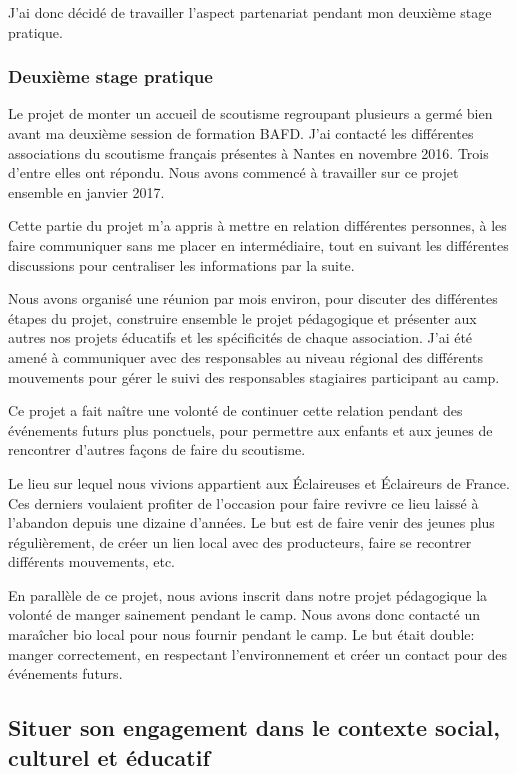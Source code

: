 \documentclass[titlepage,11pt,a4paper]{article}
\begin{document}
J'ai donc décidé de travailler l'aspect partenariat pendant mon deuxième stage pratique.

\subsubsection{Deuxième stage pratique}

Le projet de monter un accueil de scoutisme regroupant plusieurs a germé bien avant ma
deuxième session de formation BAFD\@. J'ai contacté les différentes associations du
scoutisme français présentes à Nantes en novembre 2016. Trois d'entre elles ont répondu.
Nous avons commencé à travailler sur ce projet ensemble en janvier 2017.

Cette partie du projet m'a appris à mettre en relation différentes personnes, à les faire
communiquer sans me placer en intermédiaire, tout en suivant les différentes discussions
pour centraliser les informations par la suite.

Nous avons organisé une réunion par mois environ, pour discuter des différentes étapes du
projet, construire ensemble le projet pédagogique et présenter aux autres nos projets
éducatifs et les spécificités de chaque association. J'ai été amené à communiquer avec des
responsables au niveau régional des différents mouvements pour gérer le suivi des
responsables stagiaires participant au camp.

Ce projet a fait naître une volonté de continuer cette relation pendant des événements
futurs plus ponctuels, pour permettre aux enfants et aux jeunes de rencontrer d'autres
façons de faire du scoutisme.

Le lieu sur lequel nous vivions appartient aux Éclaireuses et Éclaireurs de France. Ces
derniers voulaient profiter de l'occasion pour faire revivre ce lieu laissé à l'abandon
depuis une dizaine d'années. Le but est de faire venir des jeunes plus régulièrement, de
créer un lien local avec des producteurs, faire se recontrer différents mouvements, etc.

En parallèle de ce projet, nous avions inscrit dans notre projet pédagogique la volonté de
manger sainement pendant le camp. Nous avons donc contacté un maraîcher bio local pour nous
fournir pendant le camp. Le but était double: manger correctement, en respectant
l'environnement et créer un contact pour des événements futurs.

\subsection{Situer son engagement dans le contexte social, culturel et éducatif}
\end{document}
